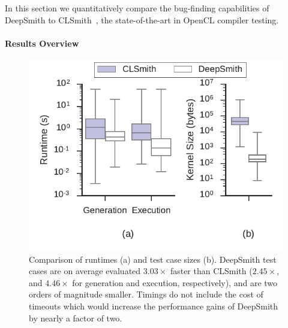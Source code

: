 In this section we quantitatively compare the bug-finding capabilities of DeepSmith to CLSmith~\cite{Lidbury2015a}, the state-of-the-art in OpenCL compiler testing.

\paragraph{Results Overview}

\begin{table}
  \scriptsize %
  \centering %
  
  \caption{%
    Results from 48 hours of testing using CLSmith and DeepSmith. Testbed \#. as per Table~\ref{tab:platforms}. $\pm$ denotes optimizations off ($-$) vs on ($+$). The remaining columns denote the number of build crash (\textbf{bc}), build timeout (\textbf{bto}), build failure (\textbf{bf}), runtime crash (\textbf{c}), wrong-output (\textbf{w}), and pass (\textbf{\cmark}) results. %
  }
  \label{tab:megatable}
\end{table}

\begin{figure}
  \centering %
  \includegraphics[width=\columnwidth]{build/img/vs-clsmith}%
  \vspace{-1em}
  \caption{%
    Comparison of runtimes (a) and test case sizes (b). DeepSmith test cases are on average evaluated $3.03\times$ faster than CLSmith ($2.45\times$, and $4.46\times$ for generation and execution, respectively), and are two orders of magnitude smaller. Timings do not include the cost of timeouts which would increase the performance gains of DeepSmith by nearly a factor of two.
  }%
  \label{fig:vs-clsmith} %
\end{figure}

